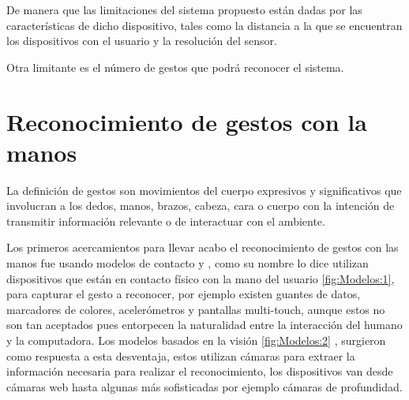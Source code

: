 De  manera que las limitaciones del sistema propuesto están dadas por las características de dicho dispositivo, tales como la distancia  a la que se encuentran los dispositivos con el usuario y la resolución del sensor. 

Otra limitante es el número de gestos que podrá reconocer el sistema.



\section{Reconocimiento de gestos con la manos}\label{sec:ReconocimientoGestos} 

La definición de gestos \citep{Mitra2007} son movimientos del cuerpo expresivos y significativos que involucran a los dedos, manos, brazos, cabeza, cara o cuerpo con la intención de transmitir información relevante o de interactuar con el ambiente.

Los primeros acercamientos para llevar acabo el reconocimiento de gestos con las manos fue usando modelos de contacto \citep{Rautaray2012} y \citep{Nayakwadi2014}, como su nombre lo dice utilizan dispositivos que est\'an en contacto f\'isico con la mano del usuario \ref{fig:Modelos:1}, para capturar el gesto a reconocer, por ejemplo existen guantes de datos, marcadores de colores, acelerómetros y pantallas multi-touch, aunque estos no son tan aceptados pues entorpecen la naturalidad entre la interacción del humano y la computadora. Los modelos basados en la visión \ref{fig:Modelos:2} , surgieron como respuesta a esta desventaja, estos utilizan cámaras para extraer la información necesaria para realizar el reconocimiento, los dispositivos van desde cámaras web hasta algunas más sofisticadas por ejemplo c\'amaras de profundidad.   

